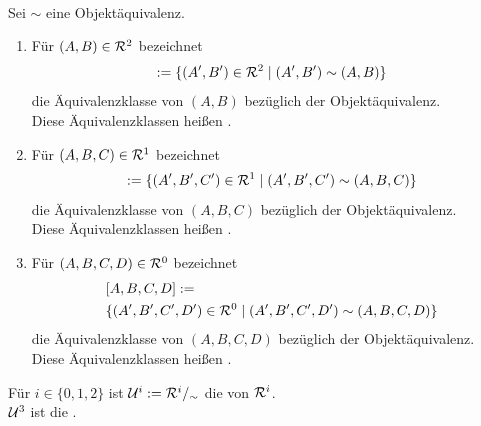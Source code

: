        \begin{dfn}\ \vspace{8pt}

            \noindent
            Sei $\sim$ eine Objektäquivalenz.
            \begin{enumerate}
                \item Für $(A,B) \in \mathcal{R}^2$ bezeichnet 
                    \begin{align*}
                        [A,B] := \{(A',B') \in \rep^2 \mid (A',B') \sim (A,B)\}
                    \end{align*}
                    die Äquivalenzklasse von $(A,B)$ bezüglich der Objektäquivalenz.\\
                    Diese Äquivalenzklassen heißen .
                    
                \item Für $(A,B,C) \in \mathcal{R}^1$ bezeichnet
                    \begin{align*}
                        [A,B,C] := \{(A',B',C') \in \rep^1 \mid (A',B',C') \sim (A,B,C)\}
                    \end{align*}			 
                    die Äquivalenzklasse von $(A,B,C)$ bezüglich der Objektäquivalenz.\\
                    Diese Äquivalenzklassen heißen .
                \item Für $(A,B,C,D) \in \mathcal{R}^0$ bezeichnet
                    \begin{align*}
                        &[A,B,C,D] := \\
                        &\{(A',B',C',D') \in \mathcal{R}^0 \mid (A',B',C',D') \sim (A,B,C,D)\}
                    \end{align*}			 
                    die Äquivalenzklasse von $(A,B,C,D)$ bezüglich der Objektäquivalenz.\\
                    Diese Äquivalenzklassen heißen .
            \end{enumerate}
            \noindent	
                Für $i \in \{0,1,2\}$ ist $\mathcal{U}^i := \mathcal{R}^i /_\sim$ die  von $\mathcal{R}^i$.\\
                $\mathcal{U}^3$ ist die .
                
        \end{dfn}
        
